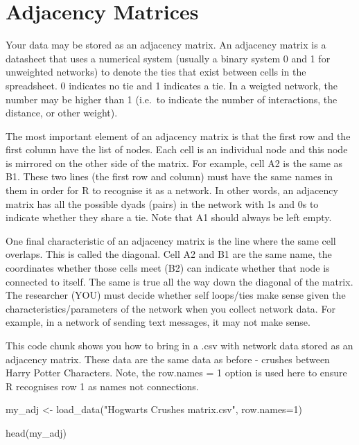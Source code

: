 \documentclass[
  letterpaper,
  DIV=11,
  numbers=noendperiod]{scrreprt}
\newenvironment{Shaded}{\begin{snugshade}}{\end{snugshade}}
\newcommand{\AttributeTok}[1]{\textcolor[rgb]{0.40,0.45,0.13}{#1}}
\newcommand{\DecValTok}[1]{\textcolor[rgb]{0.68,0.00,0.00}{#1}}
\newcommand{\FunctionTok}[1]{\textcolor[rgb]{0.28,0.35,0.67}{#1}}
\newcommand{\NormalTok}[1]{\textcolor[rgb]{0.00,0.23,0.31}{#1}}
\newcommand{\OtherTok}[1]{\textcolor[rgb]{0.00,0.23,0.31}{#1}}
\newcommand{\StringTok}[1]{\textcolor[rgb]{0.13,0.47,0.30}{#1}}
\begin{document}
\section{Adjacency Matrices}\label{adjacency-matrices}

Your data may be stored as an adjacency matrix. An adjacency matrix is a
datasheet that uses a numerical system (usually a binary system 0 and 1
for unweighted networks) to denote the ties that exist between cells in
the spreadsheet. 0 indicates no tie and 1 indicates a tie. In a weigted
network, the number may be higher than 1 (i.e.~to indicate the number of
interactions, the distance, or other weight).

The most important element of an adjacency matrix is that the first row
and the first column have the list of nodes. Each cell is an individual
node and this node is mirrored on the other side of the matrix. For
example, cell A2 is the same as B1. These two lines (the first row and
column) must have the same names in them in order for R to recognise it
as a network. In other words, an adjacency matrix has all the possible
dyads (pairs) in the network with 1s and 0s to indicate whether they
share a tie. Note that A1 should always be left empty.

One final characteristic of an adjacency matrix is the line where the
same cell overlaps. This is called the diagonal. Cell A2 and B1 are the
same name, the coordinates whether those cells meet (B2) can indicate
whether that node is connected to itself. The same is true all the way
down the diagonal of the matrix. The researcher (YOU) must decide
whether self loops/ties make sense given the characteristics/parameters
of the network when you collect network data. For example, in a network
of sending text messages, it may not make sense.

This code chunk shows you how to bring in a .csv with network data
stored as an adjacency matrix. These data are the same data as before -
crushes between Harry Potter Characters. Note, the row.names = 1 option
is used here to ensure R recognises row 1 as names not connections.

\begin{Shaded}
\begin{Highlighting}[]
\NormalTok{my\_adj  }\OtherTok{\textless{}{-}} \FunctionTok{load\_data}\NormalTok{(}\StringTok{"Hogwarts Crushes matrix.csv"}\NormalTok{, }\AttributeTok{row.names=}\DecValTok{1}\NormalTok{)}

\FunctionTok{head}\NormalTok{(my\_adj)}
\end{Highlighting}
\end{Shaded}
\end{document}
